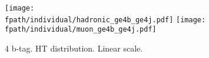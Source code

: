 \documentclass[11pt,a4paper]{article}
\def\fpath{/home/hep/elaird1/public_html/119_2012_categories/v7/}
\begin{document}
\begin{figure}
\begin{center}
\texttt{[image: \\fpath/individual/hadronic\_ge4b\_ge4j.pdf]}
\texttt{[image: \\fpath/individual/muon\_ge4b\_ge4j.pdf]}
\caption{4 b-tag. HT distribution. Linear scale.}
\end{center}
\end{figure}


\end{document}
